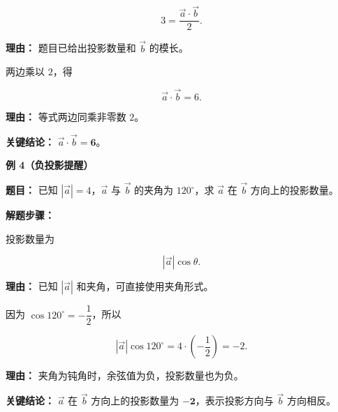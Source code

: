 \begin{examplebox}
\begin{description}[style=nextline, leftmargin=2.8em, labelsep=0.5em, itemsep=0.45em]
		      \[
			      3
			      =
			      \frac{\vec a\cdot\vec b}{2}.
		      \]

		      \par\textbf{理由：}
		      题目已给出投影数量和 $\vec b$ 的模长。


		\item[\textbf{第三步（求解点积）：}] 两边乘以 $2$，得

		      \[
			      \vec a\cdot\vec b
			      =
			      6.
		      \]

		      \par\textbf{理由：}
		      等式两边同乘非零数 $2$。

	\end{description}

	\textbf{\textcolor{CExample}{关键结论：}} $\vec a\cdot\vec b=\mathbf{6}$。

	\medskip

	\textbf{\textcolor{CExample}{例 4（负投影提醒）}}

	\textbf{\textcolor{CExample}{题目：}} 已知 $|\vec a|=4$，$\vec a$ 与 $\vec b$ 的夹角为 $120^\circ$，求 $\vec a$ 在 $\vec b$ 方向上的投影数量。

	\textbf{\textcolor{CExample}{解题步骤：}}

	\begin{description}[style=nextline, leftmargin=2.8em, labelsep=0.5em, itemsep=0.45em]

		\item[\textbf{第一步（选用夹角公式）：}] 投影数量为

		      \[
			      |\vec a|\cos\theta.
		      \]

		      \par\textbf{理由：}
		      已知 $|\vec a|$ 和夹角，可直接使用夹角形式。


		\item[\textbf{第二步（代入计算）：}] 因为 $\cos120^\circ=-\dfrac12$，所以

		      \[
			      |\vec a|\cos120^\circ
			      =
			      4\cdot\left(-\frac12\right)
			      =
			      -2.
		      \]

		      \par\textbf{理由：}
		      夹角为钝角时，余弦值为负，投影数量也为负。

	\end{description}

	\textbf{\textcolor{CExample}{关键结论：}} $\vec a$ 在 $\vec b$ 方向上的投影数量为 $\mathbf{-2}$，表示投影方向与 $\vec b$ 方向相反。

\end{examplebox}
